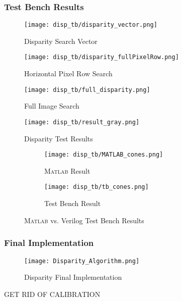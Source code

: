 \subsubsection{Test Bench Results}
\begin{figure}[H]
	\centerline{\texttt{[image: disp\_tb/disparity\_vector.png]}}
	\caption{Disparity Search Vector}
	\label{disparityVector}
\end{figure}

\begin{figure}[H]
	\centerline{\texttt{[image: disp\_tb/disparity\_fullPixelRow.png]}}
	\caption{Horizontal Pixel Row Search}
	\label{disparityRowSearch}
\end{figure}

\begin{figure}[H]
	\centerline{\texttt{[image: disp\_tb/full\_disparity.png]}}
	\caption{Full Image Search}
	\label{disparityFullSearch}
\end{figure}

\begin{figure}[H]
	\centerline{\texttt{[image: disp\_tb/result\_gray.png]}}
	\caption{Disparity Test Results}
	\label{disparityTestResults}
\end{figure}

\begin{figure}[H]
	 \begin{subfigure}[h]{1.0\textwidth}
             \centerline{\texttt{[image: disp\_tb/MATLAB\_cones.png]}}
             \caption{\textsc{Matlab} Result}
			\label{disparityMatlabResult}
         \end{subfigure} 
         \begin{subfigure}[h]{1.0\textwidth}
              \centerline{\texttt{[image: disp\_tb/tb\_cones.png]}}
             \caption{Test Bench Result}
			\label{disparityVerilogResult}
         \end{subfigure}
\label{disparityVerilogvsMatlab}
\caption{\textsc{Matlab} vs. Verilog Test Bench Results}
\end{figure}



\subsubsection{Final Implementation}
\begin{figure}[H]
	\centerline{\texttt{[image: Disparity\_Algorithm.png]}}
	\caption{Disparity Final Implementation}
	\label{disparityTestImp}
\end{figure}
\par
GET RID OF CALIBRATION 
